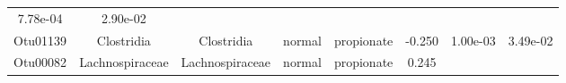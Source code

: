 \documentclass[11pt,]{article}
\begin{document}
\begin{longtable}[]{@{}cccccccc@{}}
\begin{minipage}[t]{0.08\columnwidth}
7.78e-04\strut
\end{minipage} & \begin{minipage}[t]{0.08\columnwidth}\centering\strut
2.90e-02\strut
\end{minipage}\tabularnewline
\begin{minipage}[t]{0.08\columnwidth}\centering\strut
Otu01139\strut
\end{minipage} & \begin{minipage}[t]{0.15\columnwidth}\centering\strut
Clostridia\strut
\end{minipage} & \begin{minipage}[t]{0.15\columnwidth}\centering\strut
Clostridia\strut
\end{minipage} & \begin{minipage}[t]{0.08\columnwidth}\centering\strut
normal\strut
\end{minipage} & \begin{minipage}[t]{0.09\columnwidth}\centering\strut
propionate\strut
\end{minipage} & \begin{minipage}[t]{0.07\columnwidth}\centering\strut
-0.250\strut
\end{minipage} & \begin{minipage}[t]{0.08\columnwidth}\centering\strut
1.00e-03\strut
\end{minipage} & \begin{minipage}[t]{0.08\columnwidth}\centering\strut
3.49e-02\strut
\end{minipage}\tabularnewline
\begin{minipage}[t]{0.08\columnwidth}\centering\strut
Otu00082\strut
\end{minipage} & \begin{minipage}[t]{0.15\columnwidth}\centering\strut
Lachnospiraceae\strut
\end{minipage} & \begin{minipage}[t]{0.15\columnwidth}\centering\strut
Lachnospiraceae\strut
\end{minipage} & \begin{minipage}[t]{0.08\columnwidth}\centering\strut
normal\strut
\end{minipage} & \begin{minipage}[t]{0.09\columnwidth}\centering\strut
propionate\strut
\end{minipage} & \begin{minipage}[t]{0.07\columnwidth}\centering\strut
0.245\strut
\end{minipage} & \begin{minipage}[t]{0.08\columnwidth}\centering\strut

\end{minipage}
\end{longtable}
\end{document}
